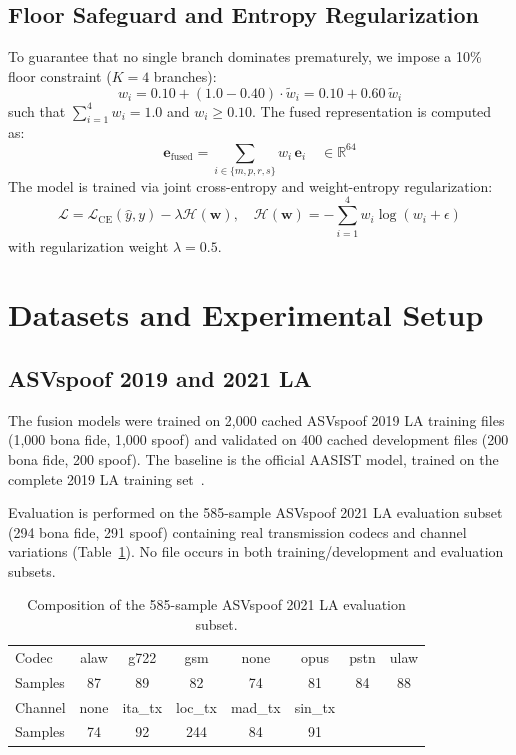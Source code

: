 \documentclass[conference]{IEEEtran}
\begin{document}
\subsection{Floor Safeguard and Entropy Regularization}
To guarantee that no single branch dominates prematurely, we impose a 10\% floor constraint ($K=4$ branches):
\begin{equation}
    w_i = 0.10 + (1.0 - 0.40) \cdot \tilde{w}_i = 0.10 + 0.60 \, \tilde{w}_i
\end{equation}
such that $\sum_{i=1}^{4} w_i = 1.0$ and $w_i \ge 0.10$. The fused representation is computed as:
\begin{equation}
    \mathbf{e}_{\text{fused}} = \sum_{i \in \{m, p, r, s\}} w_i \, \mathbf{e}_i \quad \in \mathbb{R}^{64}
\end{equation}
The model is trained via joint cross-entropy and weight-entropy regularization:
\begin{equation}
    \mathcal{L} = \mathcal{L}_{\text{CE}}(\hat{y}, y) - \lambda \mathcal{H}(\mathbf{w}), \quad \mathcal{H}(\mathbf{w}) = -\sum_{i=1}^{4} w_i \log(w_i + \epsilon)
\end{equation}
with regularization weight $\lambda = 0.5$.

\section{Datasets and Experimental Setup}

\subsection{ASVspoof 2019 and 2021 LA}
The fusion models were trained on 2,000 cached ASVspoof 2019 LA training files (1,000 bona fide, 1,000 spoof) and validated on 400 cached development files (200 bona fide, 200 spoof). The baseline is the official AASIST model, trained on the complete 2019 LA training set~\cite{jung2022aasist}.

Evaluation is performed on the 585-sample ASVspoof 2021 LA evaluation subset (294 bona fide, 291 spoof) containing real transmission codecs and channel variations (Table~\ref{tab:eval2021}). No file occurs in both training/development and evaluation subsets.

\begin{table}[t]
\caption{Composition of the 585-sample ASVspoof 2021 LA evaluation subset.}
\label{tab:eval2021}
\centering
\footnotesize
\setlength{\tabcolsep}{3.5pt}
\begin{tabular}{lccccccc}
\toprule
Codec & alaw & g722 & gsm & none & opus & pstn & ulaw\\
Samples & 87 & 89 & 82 & 74 & 81 & 84 & 88\\
\midrule
Channel & none & ita\_tx & loc\_tx & mad\_tx & sin\_tx & & \\
Samples & 74 & 92 & 244 & 84 & 91 & & \\
\bottomrule
\end{tabular}
\end{table}
\end{document}

